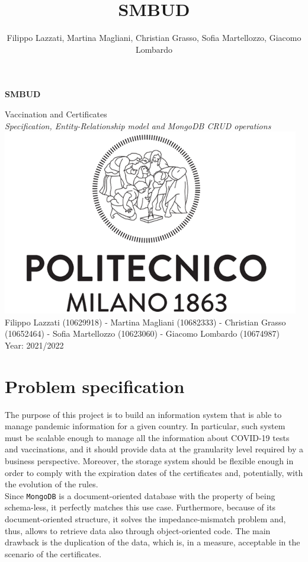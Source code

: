 \documentclass{article}
\title{SMBUD}
\author{Filippo Lazzati, Martina Magliani, Christian Grasso, Sofia Martellozzo, Giacomo Lombardo}
\begin{document}
\thispagestyle{empty}
\begin{titlepage}
    \begin{center}
       {\Huge \textbf{SMBUD}} %
       \vspace{0.5cm}
       \\
    \begin{LARGE}
        {Vaccination and Certificates}
        \vspace{1.0cm}
        \\
        {\textit{Specification, Entity-Relationship model and MongoDB CRUD operations}}
           \includegraphics[width=13cm]{logo/polimi.png}
          \vspace{1.5cm}\\
                  Filippo Lazzati (10629918) - Martina Magliani (10682333) - Christian Grasso (10652464) - Sofia Martellozzo (10623060) - Giacomo Lombardo (10674987)\\
       {Year: 2021/2022}
    \end{LARGE}  
   \end{center}
\end{titlepage}
\newpage
\tableofcontents %
\newpage
\section{Problem specification}
The purpose of this project is to build an information system that is able to manage pandemic information for a given country. In particular, such system must be scalable enough to manage all the information about COVID-19 tests and vaccinations, and it should provide data at the granularity level required by a business perspective. Moreover, the storage system should be flexible enough in order to comply with the expiration dates of the certificates and, potentially, with the evolution of the rules.\\
Since \verb|MongoDB| is a document-oriented database with the property of being schema-less, it perfectly matches this use case. Furthermore, because of its document-oriented structure, it solves the impedance-mismatch problem and, thus, allows to retrieve data also through object-oriented code. The main drawback is the duplication of the data, which is, in a measure, acceptable in the scenario of the certificates.
\end{document}
